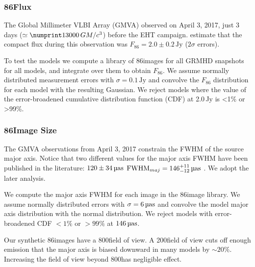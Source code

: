 \subsubsection{86\GHz Flux}

The Global Millimeter VLBI Array (GMVA) observed \sgra on April 3, 2017, just 3 days ($\simeq \no{13000}\,\tg$) before the EHT campaign.
\citet{2019ApJ...871...30I} estimate that the compact flux during this observation was $F_{86} = 2.0 \pm 0.2\,\mathrm{Jy}$ ($2\sigma$ errors).

To test the models we compute a library of 86\GHz images for all GRMHD snapshots for all models, and integrate over them to obtain  $F_{86}$.
We assume normally distributed measurement errors with $\sigma = 0.1\,\mathrm{Jy}$ and convolve the $F_{86}$ distribution for each model with the resulting Gaussian.
We reject models where the value of the error-broadened cumulative distribution function (CDF) at 2.0\,Jy is <1\% or >99\%.

\subsubsection{86\GHz Image Size}\label{sec:86size}

The GMVA observations from April 3, 2017 constrain the FWHM of the source major axis.
Notice that two different values for the major axis FWHM have been published in the literature: $120 \pm 34\uas$ \citep{2019ApJ...871...30I}
${\rm FWHM}_{maj} = 146^{+11}_{-12}\uas$ \citep[95\% confidence][]{2021ApJ...915...99I}.
We adopt the later analysis.

We compute the major axis FWHM for each image in the 86\GHz image library.
We assume normally distributed errors with $\sigma = 6\uas$ and convolve the model major axis distribution with the normal distribution.
We reject models with error-broadened CDF $< 1\%$ or $> 99\%$ at $146\uas$.

Our synthetic 86\GHz images have a 800\uas field of view.
A 200\uas field of view cuts off enough emission that the major axis is biased downward in many models by $\sim 20\%$.
Increasing the field of view beyond 800\uas has negligible effect.

